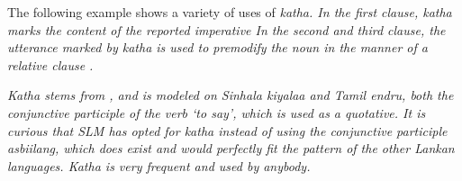 
The following example shows a variety of uses of \em katha\em. In the first clause, \em katha \em marks the content of the reported imperative 
In the second and third clause, the utterance marked by \em katha \em is used to premodify the noun  in the manner of a relative clause .



\em Katha \em stems from , and is modeled on Sinhala \em kiyalaa \em and Tamil \em endru\em, both the conjunctive participle of the verb `to say', which is used as a quotative. It is curious that SLM has opted for \em katha \em instead of using the conjunctive participle \em asbiilang\em, which does exist and would perfectly fit the pattern of the other Lankan languages.
\em Katha \em is very frequent and used by anybody.


